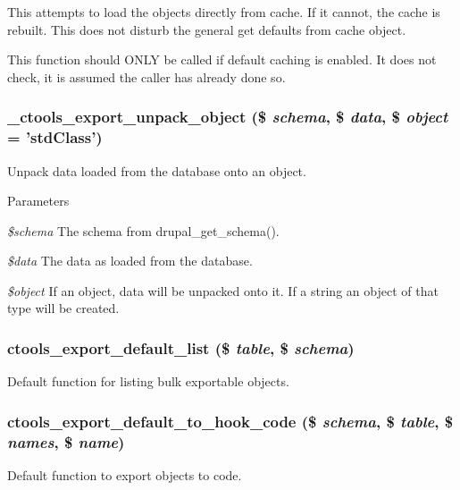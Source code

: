 This attempts to load the objects directly from cache. If it cannot, the cache is rebuilt. This does not disturb the general get defaults from cache object.

This function should ONLY be called if default caching is enabled. It does not check, it is assumed the caller has already done so. \hypertarget{export_8inc_adc4345fc217c5b8ca3099ea34f824a21}{
\subsubsection[{\_\-ctools\_\-export\_\-unpack\_\-object}]{\setlength{\rightskip}{0pt plus 5cm}\_\-ctools\_\-export\_\-unpack\_\-object (\$ {\em schema}, \/  \$ {\em data}, \/  \$ {\em object} = {\ttfamily 'stdClass'})}}
\label{export_8inc_adc4345fc217c5b8ca3099ea34f824a21}
Unpack data loaded from the database onto an object.


\begin{DoxyParams}{Parameters}
\item[{\em \$schema}]The schema from drupal\_\-get\_\-schema(). \item[{\em \$data}]The data as loaded from the database. \item[{\em \$object}]If an object, data will be unpacked onto it. If a string an object of that type will be created. \end{DoxyParams}
\hypertarget{export_8inc_a8da42c0a66938e72bd6651f03399e212}{
\subsubsection[{ctools\_\-export\_\-default\_\-list}]{\setlength{\rightskip}{0pt plus 5cm}ctools\_\-export\_\-default\_\-list (\$ {\em table}, \/  \$ {\em schema})}}
\label{export_8inc_a8da42c0a66938e72bd6651f03399e212}
Default function for listing bulk exportable objects. \hypertarget{export_8inc_a3d760199cfd97c57824512913257d3a1}{
\subsubsection[{ctools\_\-export\_\-default\_\-to\_\-hook\_\-code}]{\setlength{\rightskip}{0pt plus 5cm}ctools\_\-export\_\-default\_\-to\_\-hook\_\-code (\$ {\em schema}, \/  \$ {\em table}, \/  \$ {\em names}, \/  \$ {\em name})}}
\label{export_8inc_a3d760199cfd97c57824512913257d3a1}
Default function to export objects to code.

